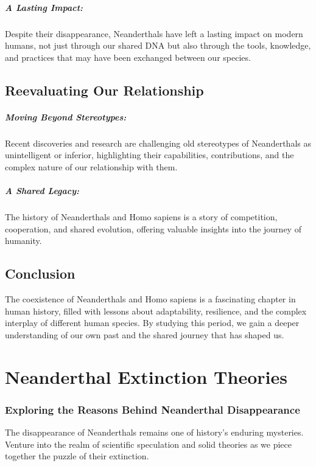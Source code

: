\documentclass[a4paper,12pt]{book}
\begin{document}
\paragraph{A Lasting Impact:}
Despite their disappearance, Neanderthals have left a lasting impact on modern humans, not just through our shared DNA but also through the tools, knowledge, and practices that may have been exchanged between our species.

\section*{Reevaluating Our Relationship}

\paragraph{Moving Beyond Stereotypes:}
Recent discoveries and research are challenging old stereotypes of Neanderthals as unintelligent or inferior, highlighting their capabilities, contributions, and the complex nature of our relationship with them.

\paragraph{A Shared Legacy:}
The history of Neanderthals and Homo sapiens is a story of competition, cooperation, and shared evolution, offering valuable insights into the journey of humanity.

\section*{Conclusion}

The coexistence of Neanderthals and Homo sapiens is a fascinating chapter in human history, filled with lessons about adaptability, resilience, and the complex interplay of different human species. By studying this period, we gain a deeper understanding of our own past and the shared journey that has shaped us.

\chapter{Neanderthal Extinction Theories}
\subsection*{Exploring the Reasons Behind Neanderthal Disappearance}
The disappearance of Neanderthals remains one of history's enduring mysteries. Venture into the realm of scientific speculation and solid theories as we piece together the puzzle of their extinction.
\end{document}
